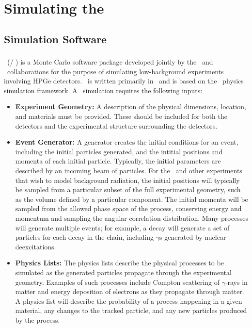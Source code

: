 \documentclass[/main.tex]{subfiles}
\begin{document}
\graphicspath{{./pics/}{ch3/pics/}}

\onlyinsubfile{\textpages}
\chapter{Simulating the \MJD}\label{ch:sims}

\section{Simulation Software}
\subsection{\Mage}
\Mage\ (\MJ / \Gerda) \cite{mage2011} is a Monte Carlo software package developed jointly by the \MJ\ and \Gerda\ collaborations for the purpose of simulating low-background experiments involving HPGe detectors.
\Mage\ is written primarily in \cpp\ and is based on the \geant\ physics simulation framework\cite{geant2003}.
A \geant\ simulation requires the following inputs:
\begin{itemize}
\item{\textbf{Experiment Geometry:}}
  A description of the physical dimensions, location, and materials must be provided.
  These should be included for both the detectors and the experimental structure surrounding the detectors.
\item{\textbf{Event Generator:}}
  A generator creates the initial conditions for an event, including the initial particles generated, and the intitial positions and momenta of each initial particle.
  Typically, the initial parameters are described by an incoming beam of particles.
  For the \MJD\ and other experiments that wish to model background radiation, the initial positions will typically be sampled from a particular subset of the full experimental geometry, such as the volume defined by a particular component.
  The initial momenta will be sampled from the allowed phase space of the process, conserving energy and momentum and sampling the angular correlation distribution.
  Many processes will generate multiple events; for example, a  decay will generate a set of particles for each decay in the chain, including $\gamma$s generated by nuclear deexcitations.
\item{\textbf{Physics Lists:}}
  The physics lists describe the physical processes to be simulated as the generated particles propagate through the experimental geometry.
  Examples of such processes include Compton scattering of $\gamma$-rays in matter and energy deposition of electrons as they propagate through matter.
  A physics list will describe the probability of a process happening in a given material, any changes to the tracked particle, and any new particles produced by the process.
\end{itemize}
\end{document}
